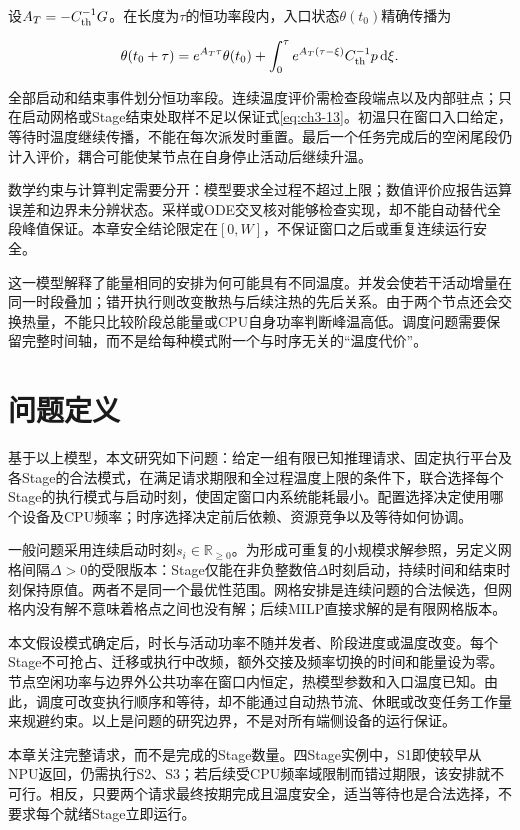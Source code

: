设\(A_T=-C_{\rm th}^{-1}G\)。在长度为\(\tau\)的恒功率段内，入口状态\(\theta(t_0)\)精确传播为

\begin{equation}
\theta(t_0+\tau)=e^{A_T\tau}\theta(t_0)
+\int_0^\tau e^{A_T(\tau-\xi)}C_{\rm th}^{-1}p\,\mathrm d\xi.
\label{eq:ch3-14}
\end{equation}

全部启动和结束事件划分恒功率段。连续温度评价需检查段端点以及内部驻点；只在启动网格或Stage结束处取样不足以保证式\eqref{eq:ch3-13}。初温只在窗口入口给定，等待时温度继续传播，不能在每次派发时重置。最后一个任务完成后的空闲尾段仍计入评价，耦合可能使某节点在自身停止活动后继续升温。

数学约束与计算判定需要分开：模型要求全过程不超过上限；数值评价应报告运算误差和边界未分辨状态。采样或ODE交叉核对能够检查实现，却不能自动替代全段峰值保证。本章安全结论限定在\([0,W]\)，不保证窗口之后或重复连续运行安全。


这一模型解释了能量相同的安排为何可能具有不同温度。并发会使若干活动增量在同一时段叠加；错开执行则改变散热与后续注热的先后关系。由于两个节点还会交换热量，不能只比较阶段总能量或CPU自身功率判断峰温高低。调度问题需要保留完整时间轴，而不是给每种模式附一个与时序无关的“温度代价”。

\section{问题定义}

基于以上模型，本文研究如下问题：给定一组有限已知推理请求、固定执行平台及各Stage的合法模式，在满足请求期限和全过程温度上限的条件下，联合选择每个Stage的执行模式与启动时刻，使固定窗口内系统能耗最小。配置选择决定使用哪个设备及CPU频率；时序选择决定前后依赖、资源竞争以及等待如何协调。

一般问题采用连续启动时刻\(s_i\in\mathbb R_{\ge0}\)。为形成可重复的小规模求解参照，另定义网格间隔\(\Delta>0\)的受限版本：Stage仅能在非负整数倍\(\Delta\)时刻启动，持续时间和结束时刻保持原值。两者不是同一个最优性范围。网格安排是连续问题的合法候选，但网格内没有解不意味着格点之间也没有解；后续MILP直接求解的是有限网格版本。

本文假设模式确定后，时长与活动功率不随并发者、阶段进度或温度改变。每个Stage不可抢占、迁移或执行中改频，额外交接及频率切换的时间和能量设为零。节点空闲功率与边界外公共功率在窗口内恒定，热模型参数和入口温度已知。由此，调度可改变执行顺序和等待，却不能通过自动热节流、休眠或改变任务工作量来规避约束。以上是问题的研究边界，不是对所有端侧设备的运行保证。

本章关注完整请求，而不是完成的Stage数量。四Stage实例中，S1即使较早从NPU返回，仍需执行S2、S3；若后续受CPU频率域限制而错过期限，该安排就不可行。相反，只要两个请求最终按期完成且温度安全，适当等待也是合法选择，不要求每个就绪Stage立即运行。


